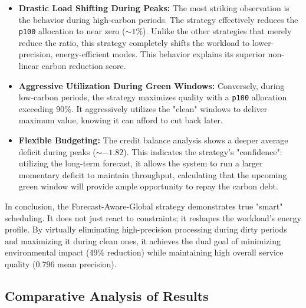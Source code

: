 \begin{itemize}


    \item \textbf{Drastic Load Shifting During Peaks:} The most striking observation is the behavior during high-carbon periods. The strategy effectively reduces the \texttt{p100} allocation to near zero ($\sim1\%$). Unlike the other strategies that merely reduce the ratio, this strategy completely shifts the workload to lower-precision, energy-efficient modes. This behavior explains its superior non-linear carbon reduction score.


    


    \item \textbf{Aggressive Utilization During Green Windows:} Conversely, during low-carbon periods, the strategy maximizes quality with a \texttt{p100} allocation exceeding 90\%. It aggressively utilizes the "clean" windows to deliver maximum value, knowing it can afford to cut back later.


    


    \item \textbf{Flexible Budgeting:} The credit balance analysis shows a deeper average deficit during peaks ($\sim-1.82$). This indicates the strategy's "confidence": utilizing the long-term forecast, it allows the system to run a larger momentary deficit to maintain throughput, calculating that the upcoming green window will provide ample opportunity to repay the carbon debt.


\end{itemize}





In conclusion, the Forecast-Aware-Global strategy demonstrates true "smart" scheduling. It does not just react to constraints; it reshapes the workload's energy profile. By virtually eliminating high-precision processing during dirty periods and maximizing it during clean ones, it achieves the dual goal of minimizing environmental impact (49\% reduction) while maintaining high overall service quality (0.796 mean precision).





\subsection{Comparative Analysis of Results}





